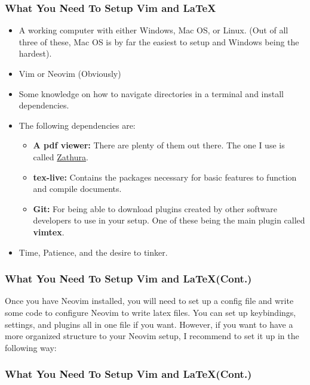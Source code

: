 \documentclass{beamer}
\begin{document}
\begin{frame}
    \frametitle{What You Need To Setup Vim and \LaTeX}
    \begin{itemize}
        \item A working computer with either Windows, Mac OS, or Linux. (Out of all three of these, Mac OS is by far the easiest to setup and Windows being the hardest).
        \item Vim or Neovim (Obviously)
        \item Some knowledge on how to navigate directories in a terminal and install dependencies.
        \item The following dependencies are: 
            \begin{itemize}
                \item \textbf{A pdf viewer:} There are plenty of them out there. The one I use is called \href{https://pwmt.org/projects/zathura/}{Zathura}. 
                \item \textbf{tex-live:} Contains the packages necessary for basic features to function and compile documents. 
                \item \textbf{Git:} For being able to download plugins created by other software developers to use in your setup. One of these being the main plugin called \textbf{vimtex}.
            \end{itemize}
        \item Time, Patience, and the desire to tinker.
    \end{itemize}
\end{frame}

\begin{frame}
    \frametitle{What You Need To Setup Vim and \LaTeX (Cont.)}
    Once you have Neovim installed, you will need to set up a config file and write some code to configure Neovim to write latex files. You can set up keybindings, settings, and plugins all in one file if you want. However, if you want to have a more organized structure to your Neovim setup, I recommend to set it up in the following way:
\end{frame}

\begin{frame}
    \frametitle{What You Need To Setup Vim and \LaTeX (Cont.)}
\end{frame}
\end{document}
